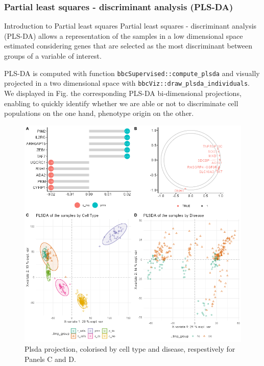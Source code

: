 \subsubsection{Partial least squares - discriminant analysis (PLS-DA)} 
\label{partial-least-squares---discriminant-analysis-pls-da}

\begin{info}{Introduction to Partial least squares}
Partial least squares - discriminant analysis (PLS-DA) allows a representation of the samples in a low dimensional space estimated considering genes that are selected as the most discriminant between groups of a variable of interest.

\end{info}

PLS-DA is computed with function \texttt{bbcSupervised::compute\_plsda} and visually projected in a two dimensional space with \texttt{bbcViz::draw\_plsda\_individuals}. We displayed in Fig.  the corresponding PLS-DA bi-dimensional projections, enabling to quickly identify whether we are able or not to discriminate cell populations on the one hand, phenotype origin on the other.

\begin{figure}

{\centering \includegraphics[width=0.8\linewidth]{figures/plsda_plots} 

}

\caption{Plsda projection, colorised by cell type and disease, respestively for Panels C and D.}\label{fig:plsda-representation}
\end{figure}



